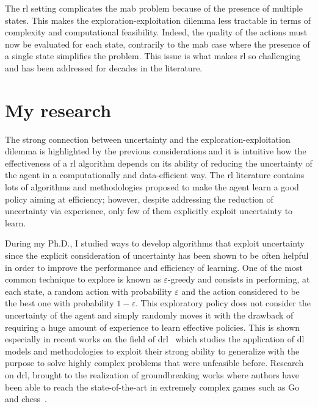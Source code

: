 The \gls{rl} setting complicates the \gls{mab} problem because of the presence of multiple states. This makes the exploration-exploitation dilemma less tractable in terms of complexity and computational feasibility. Indeed, the quality of the actions must now be evaluated for each state, contrarily to the \gls{mab} case where the presence of a single state simplifies the problem. This issue is what makes \gls{rl} so challenging and has been addressed for decades in the literature.

\section{My research}
The strong connection between uncertainty and the exploration-exploitation dilemma is highlighted by the previous considerations and it is intuitive how the effectiveness of a \gls{rl} algorithm depends on its ability of reducing the uncertainty of the agent in a computationally and data-efficient way. The \gls{rl} literature contains lots of algorithms and methodologies proposed to make the agent learn a good policy aiming at efficiency; however, despite addressing the reduction of uncertainty via experience, only few of them explicitly exploit uncertainty to learn.

During my Ph.D., I studied ways to develop algorithms that exploit uncertainty since the explicit consideration of uncertainty has been shown to be often helpful in order to improve the performance and efficiency of learning. One of the most common technique to explore is known as $\varepsilon$-greedy and consists in performing, at each state, a random action with probability $\varepsilon$ and the action considered to be the best one with probability $1 - \varepsilon$. This exploratory policy does not consider the uncertainty of the agent and simply randomly moves it with the drawback of requiring a huge amount of experience to learn effective policies. This is shown especially in recent works on the field of \gls{drl}~\cite{mnih2015human, van2016deep, wang2015dueling} which studies the application of \gls{dl} models and methodologies to exploit their strong ability to generalize with the purpose to solve highly complex problems that were unfeasible before. Research on \gls{drl}, brought to the realization of groundbreaking works where authors have been able to reach the state-of-the-art in extremely complex games such as Go~\cite{silver2016mastering, silver2017mastering} and chess~\cite{silver2017chess}.

